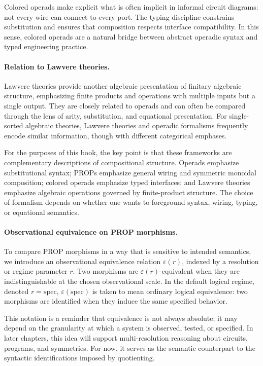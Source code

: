 Colored operads make explicit what is often implicit in informal circuit diagrams: not every wire can connect to every port. The typing discipline constrains substitution and ensures that composition respects interface compatibility. In this sense, colored operads are a natural bridge between abstract operadic syntax and typed engineering practice.

\paragraph{Relation to Lawvere theories.}
Lawvere theories provide another algebraic presentation of finitary algebraic structure, emphasizing finite products and operations with multiple inputs but a single output. They are closely related to operads and can often be compared through the lens of arity, substitution, and equational presentation. For single-sorted algebraic theories, Lawvere theories and operadic formalisms frequently encode similar information, though with different categorical emphases.

For the purposes of this book, the key point is that these frameworks are complementary descriptions of compositional structure. Operads emphasize substitutional syntax; PROPs emphasize general wiring and symmetric monoidal composition; colored operads emphasize typed interfaces; and Lawvere theories emphasize algebraic operations governed by finite-product structure. The choice of formalism depends on whether one wants to foreground syntax, wiring, typing, or equational semantics.

\paragraph{Observational equivalence on PROP morphisms.}
To compare PROP morphisms in a way that is sensitive to intended semantics, we introduce an observational equivalence relation \(\varepsilon(r)\), indexed by a resolution or regime parameter \(r\). Two morphisms are \(\varepsilon(r)\)-equivalent when they are indistinguishable at the chosen observational scale. In the default logical regime, denoted \(r = \mathrm{spec}\), \(\varepsilon(\mathrm{spec})\) is taken to mean ordinary logical equivalence: two morphisms are identified when they induce the same specified behavior.

This notation is a reminder that equivalence is not always absolute; it may depend on the granularity at which a system is observed, tested, or specified. In later chapters, this idea will support multi-resolution reasoning about circuits, programs, and symmetries. For now, it serves as the semantic counterpart to the syntactic identifications imposed by quotienting.


